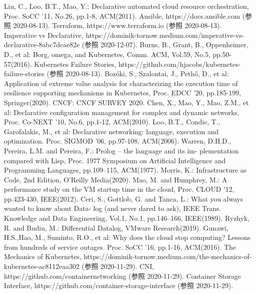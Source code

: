 \documentclass[12pt,a4j]{ujreport}
\begin{document}
\renewcommand{\bibname}{参考文献}
\begin{thebibliography}{99}
     Liu, C., Loo, B.T., Mao, Y.: Declarative automated cloud resource orchestration, Proc. SoCC ’11, No.26, pp.1-8, ACM(2011).
     Ansible, https://docs.ansible.com (参照 2020-08-13).
     Terraform, https://www.terraform.io (参照 2020-08-13).
     Imperative vs Declarative, https://dominik-tornow.medium.com/imperative-vs-declarative-8abc7dcae82e (参照 2020-12-07).
     Burns, B., Grant, B., Oppenheimer, D., et al: Borg, omega, and Kubernetes, Comm. ACM, Vol.59, No.5, pp.50-57(2016).
     Kubernetes Failure Stories, https://github.com/hjacobs/kubernetes-failure-stories (参照 2020-08-13).
     Bozóki, S., Szalontai, J., Pethő, D., et al: Application of extreme value analysis for characterizing the execution time of resilience supporting mechanisms in Kubernetes, Proc. EDCC ’20, pp.185-199, Springer(2020).
     CNCF: CNCF SURVEY 2020.
     Chen, X., Mao, Y., Mao, Z.M., et al: Declarative configuration management for complex and dynamic networks, Proc. Co-NEXT ’10, No.6, pp.1-12, ACM(2010).
     Loo, B.T., Condie, T., Garofalakis, M., et al: Declarative networking: language, execution and optimization. Proc. SIGMOD '06, pp.97-108, ACM(2006).
     Warren, D.H.D., Pereira, L.M. and Pereira, F.: Prolog – the language and its im- plementation compared with Lisp, Proc. 1977 Symposium on Artificial Intelligence and Programming Languages, pp.109–115, ACM(1977).
     Morris, K.: Infrastructure as Code, 2nd Edition, O'Reilly Media(2020).
     Mao, M. and Humphrey, M.: A performance study on the VM startup time in the cloud, Proc. CLOUD '12, pp.423-430, IEEE(2012).
     Ceri, S., Gottlob, G. and Tanca, L.: What you always wanted to know about Data- log (and never dared to ask), IEEE Trans. Knowledge and Data Engineering, Vol.1, No.1, pp.146–166, IEEE(1989).
     Ryzhyk, R. and Budiu, M.: Differential Datalog, VMware Research(2019).
     Gunawi, H.S.,Hao, M., Suminto, R.O., et al: Why does the cloud stop computing? Lessons from hundreds of service outages. Proc. SoCC '16, pp.1-16, ACM(2016).
     The Mechanics of Kubernetes, https://dominik-tornow.medium.com/the-mechanics-of-kubernetes-ac8112eaa302 (参照 2020-11-29).
     CNI, https://github.com/containernetworking (参照 2020-11-29).
     Container Storage Interface, https://github.com/container-storage-interface (参照 2020-11-29).

\end{thebibliography}
\end{document}
